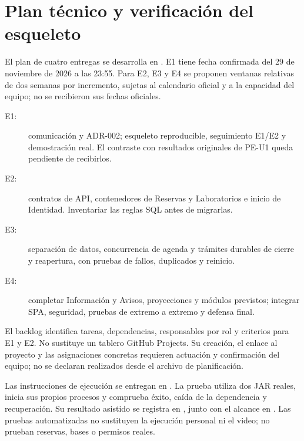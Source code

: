 \section{Plan técnico y verificación del esqueleto}
\label{sec:clab-plan-desarrollo}

El plan de cuatro entregas se desarrolla en
. E1 tiene fecha confirmada del
29 de noviembre de 2026 a las 23:55. Para E2, E3 y E4 se proponen ventanas
relativas de dos semanas por incremento, sujetas al calendario oficial y a la
capacidad del equipo; no se recibieron sus fechas oficiales.

\begin{description}
  \item[E1:] comunicación y ADR-002; esqueleto reproducible, seguimiento E1/E2
  y demostración real. El contraste con resultados originales de PE-U1 queda
  pendiente de recibirlos.
  \item[E2:] contratos de API, contenedores de Reservas y Laboratorios e inicio
  de Identidad. Inventariar las reglas SQL antes de migrarlas.
  \item[E3:] separación de datos, concurrencia de agenda y trámites durables de
  cierre y reapertura, con pruebas de fallos, duplicados y reinicio.
  \item[E4:] completar Información y Avisos, proyecciones y módulos previstos;
  integrar SPA, seguridad, pruebas de extremo a extremo y defensa final.
\end{description}

El backlog identifica tareas, dependencias, responsables por rol y criterios
para E1 y E2. No sustituye un tablero GitHub Projects. Su creación, el enlace
al proyecto y las asignaciones concretas requieren actuación y confirmación
del equipo; no se declaran realizados desde el archivo de planificación.

Las instrucciones de ejecución se entregan en .
La prueba  utiliza dos JAR reales, inicia
sus propios procesos y comprueba éxito, caída de la dependencia y recuperación.
Su resultado asistido se registra en
, junto con el alcance en
. Las pruebas automatizadas no sustituyen
la ejecución personal ni el video; no prueban reservas, bases o permisos reales.
